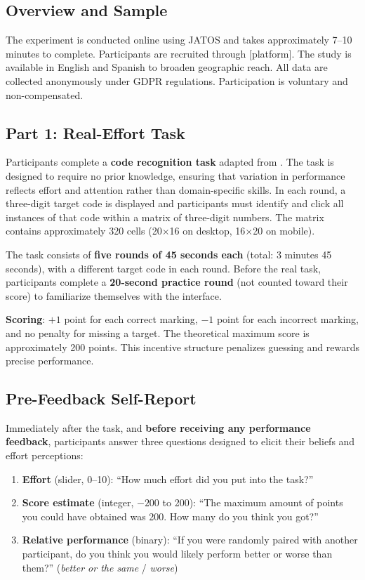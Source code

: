 \documentclass[12pt]{article}
\begin{document}
\subsection{Overview and Sample}

The experiment is conducted online using JATOS and takes approximately 7--10 minutes to complete. Participants are recruited through [platform]. The study is available in English and Spanish to broaden geographic reach. All data are collected anonymously under GDPR regulations. Participation is voluntary and non-compensated.

\subsection{Part 1: Real-Effort Task}

Participants complete a \textbf{code recognition task} adapted from \citet{almas2020}. The task is designed to require no prior knowledge, ensuring that variation in performance reflects effort and attention rather than domain-specific skills. In each round, a three-digit target code is displayed and participants must identify and click all instances of that code within a matrix of three-digit numbers. The matrix contains approximately 320 cells (20$\times$16 on desktop, 16$\times$20 on mobile).

The task consists of \textbf{five rounds of 45 seconds each} (total: 3 minutes 45 seconds), with a different target code in each round. Before the real task, participants complete a \textbf{20-second practice round} (not counted toward their score) to familiarize themselves with the interface.

\textbf{Scoring}: $+1$ point for each correct marking, $-1$ point for each incorrect marking, and no penalty for missing a target. The theoretical maximum score is approximately 200 points. This incentive structure penalizes guessing and rewards precise performance.

\subsection{Pre-Feedback Self-Report}

Immediately after the task, and \textbf{before receiving any performance feedback}, participants answer three questions designed to elicit their beliefs and effort perceptions:

\begin{enumerate}
  \item \textbf{Effort} (slider, 0--10): ``How much effort did you put into the task?''
  \item \textbf{Score estimate} (integer, $-200$ to 200): ``The maximum amount of points you could have obtained was 200. How many do you think you got?''
  \item \textbf{Relative performance} (binary): ``If you were randomly paired with another participant, do you think you would likely perform better or worse than them?'' (\textit{better or the same} / \textit{worse})
\end{enumerate}
\end{document}
